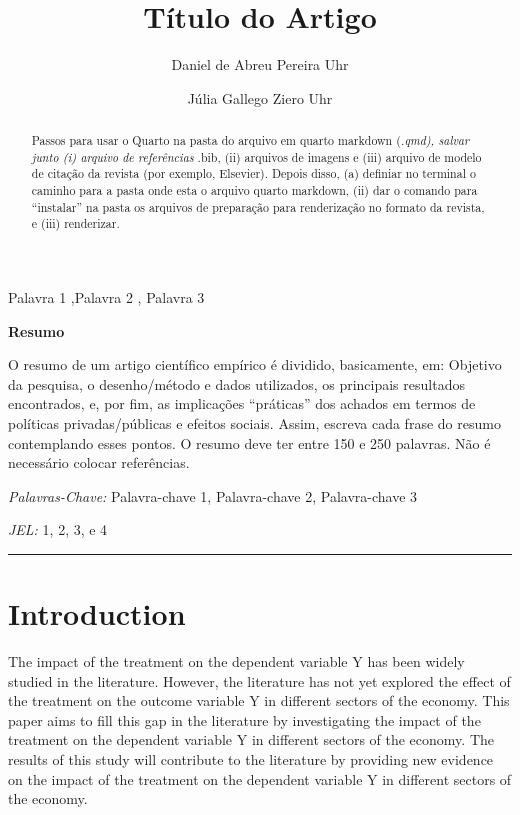 \documentclass[
  authoryear,
  preprint,
  3p,
  onecolumn]{elsarticle}
\begin{document}
\begin{frontmatter}
\title{Título do Artigo}
\author[1]{Daniel de Abreu Pereira Uhr%
%
}
\author[1]{Júlia Gallego Ziero Uhr%
%
}





        
\begin{abstract}
Passos para usar o Quarto na pasta do arquivo em quarto markdown
(\emph{.qmd), salvar junto (i) arquivo de referências }.bib, (ii)
arquivos de imagens e (iii) arquivo de modelo de citação da revista (por
exemplo, Elsevier). Depois disso, (a) definiar no terminal o caminho
para a pasta onde esta o arquivo quarto markdown, (ii) dar o comando
para ``instalar'' na pasta os arquivos de preparação para renderização
no formato da revista, e (iii) renderizar.
\end{abstract}





\begin{keyword}
    Palavra 1 \sep Palavra 2 \sep 
    Palavra 3
\end{keyword}
\end{frontmatter}
    

\textbf{Resumo}

O resumo de um artigo científico empírico é dividido, basicamente, em:
Objetivo da pesquisa, o desenho/método e dados utilizados, os principais
resultados encontrados, e, por fim, as implicações ``práticas'' dos
achados em termos de políticas privadas/públicas e efeitos sociais.
Assim, escreva cada frase do resumo contemplando esses pontos. O resumo
deve ter entre 150 e 250 palavras. Não é necessário colocar referências.

\emph{Palavras-Chave:} Palavra-chave 1, Palavra-chave 2, Palavra-chave 3

\emph{JEL:} 1, 2, 3, e 4

\begin{center}\rule{0.5\linewidth}{0.5pt}\end{center}

\section{Introduction}\label{introduction}

The impact of the treatment on the dependent variable Y has been widely
studied in the literature. However, the literature has not yet explored
the effect of the treatment on the outcome variable Y in different
sectors of the economy. This paper aims to fill this gap in the
literature by investigating the impact of the treatment on the dependent
variable Y in different sectors of the economy. The results of this
study will contribute to the literature by providing new evidence on the
impact of the treatment on the dependent variable Y in different sectors
of the economy.
\end{document}
